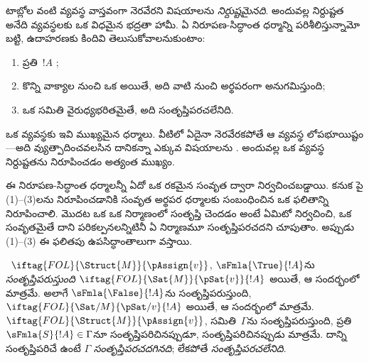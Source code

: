 \documentclass[../../../include/open-logic-section]{subfiles}
\begin{document}
      {}
      {}


\begin{explain}
టాబ్లోల వంటి  వ్యవస్థ వాస్తవంగా నెరవేరని విషయాలను
 \emph{నిర్దుష్టమైనది}. అందువల్ల నిర్దుష్టత
అనేది  వ్యవస్థలకు ఒక విధమైన భద్రతా హామీ. ఏ
నిరూపణ-సిద్ధాంత ధర్మాన్ని పరిశీలిస్తున్నామో బట్టి, ఉదాహరణకు కిందివి
తెలుసుకోవాలనుకుంటాం:
\begin{enumerate}
\item {} ప్రతి~$!A$ ;
\item కొన్ని వాక్యాల నుంచి ఒక  
  అయితే, అది వాటి నుంచి అర్థపరంగా అనుగమిస్తుంది;
\item ఒక  సమితి వైరుధ్యభరితమైతే, అది
  సంతృప్తిపరచలేనిది.
\end{enumerate}
ఒక  వ్యవస్థకు ఇవి ముఖ్యమైన ధర్మాలు. వీటిలో ఏదైనా
నెరవేరకపోతే ఆ  వ్యవస్థ లోపభూయిష్టం---అది వ్యుత్పాదించవలసిన దానికన్నా ఎక్కువ విషయాలను
. అందువల్ల ఒక  వ్యవస్థ
నిర్దుష్టతను నిరూపించడం అత్యంత ముఖ్యం.

ఈ నిరూపణ-సిద్ధాంత ధర్మాలన్నీ ఏదో ఒక రకమైన సంవృత  ద్వారా
నిర్వచించబడ్డాయి. కనుక పై (1)--(3)లను నిరూపించడానికి సంవృత
 అర్థపర ధర్మాలకు సంబంధించిన ఒక ఫలితాన్ని నిరూపించాలి. మొదట ఒక
 ఒక నిర్మాణంలో సంతృప్తి చెందడం అంటే ఏమిటో
నిర్వచించి, ఒక  సంవృతమైతే దాని పరికల్పనలన్నిటినీ ఏ
నిర్మాణమూ సంతృప్తిపరచదని చూపుతాం. అప్పుడు (1)--(3) ఈ ఫలితపు
ఉపసిద్ధాంతాలుగా వస్తాయి.
\end{explain}

\begin{defn}
~$\iftag{FOL}{\Struct{M}}{\pAssign{v}}$,
 $\sFmla{\True}{!A}$ను \emph{సంతృప్తిపరుస్తుంది}
$\iftag{FOL}{\Sat{M}}{\pSat{v}}{!A}$ అయితే, ఆ సందర్భంలో మాత్రమే. అలాగే
$\sFmla{\False}{!A}$ను సంతృప్తిపరుస్తుంది,
$\iftag{FOL}{\Sat/{M}}{\pSat/{v}}{!A}$ అయితే, ఆ సందర్భంలో మాత్రమే. $\iftag{FOL}{\Struct{M}}{\pAssign{v}}$,
 సమితి~$\Gamma$ను సంతృప్తిపరుస్తుంది, ప్రతి
$\sFmla{S}{!A} \in \Gamma$నూ సంతృప్తిపరిచినప్పుడూ, సంతృప్తిపరిచినప్పుడు మాత్రమే. దాన్ని
సంతృప్తిపరిచే 
ఉంటే $\Gamma$ \emph{సంతృప్తిపరచదగినది}; లేకపోతే
\emph{సంతృప్తిపరచలేనిది}.
\end{defn}
\end{document}
